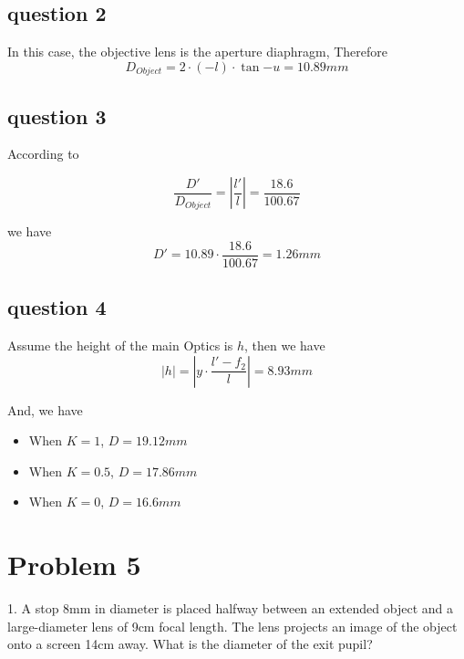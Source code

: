 \documentclass{article}
\begin{document}
\subsection{question 2}
In this case, the objective lens is the aperture diaphragm, Therefore
\begin{equation}
    \boxed{
        D_{Object} = 2\cdot(-l)\cdot\tan{-u} = 10.89mm
    }
\end{equation}

\subsection{question 3}

According to 

\begin{equation}
    \frac{D'}{D_{Object}} = \left|\frac{l'}{l}\right| = \frac{18.6}{100.67}
\end{equation}

we have
\begin{equation}
    \boxed{
        D' =  10.89\cdot \frac{18.6}{100.67} = 1.26mm
    }
\end{equation}

\subsection{question 4}

Assume the height of the main Optics is $h$, then we have
\begin{equation}
    \left|h\right| = \left|y\cdot\frac{l'-f_2}{l}\right| = 8.93mm
\end{equation}

And, we have
\begin{itemize}
    \item When $K=1$, $D = 19.12mm$
    \item When $K=0.5$, $D = 17.86mm$
    \item When $K=0$, $D = 16.6mm$
\end{itemize}


\section{Problem 5}
1. A stop 8mm in diameter is placed halfway between an extended object and a large-diameter lens of 9cm focal length. The lens projects an image of the object onto a screen 14cm away. What is the diameter of the exit pupil?\\
\end{document}
